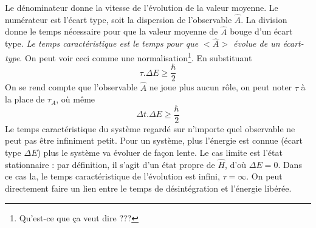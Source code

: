 Le dénominateur donne la vitesse de l'évolution de la valeur moyenne. Le numérateur est l'écart
type, soit la dispersion de l'observable $\hat A$. La division donne le temps nécessaire pour que la 
valeur moyenne de $\hat A$ bouge d'un écart type.\textit{ Le temps caractéristique est le temps pour que $<\hat A>$ évolue de un écart-type}. 
On peut voir ceci comme une normalisation\footnote{Qu'est-ce que ça veut dire ???}. En substituant
\begin{equation}
\tau.\Delta E \geq \dfrac{\hbar}{2}
\end{equation}
On se rend compte que l'observable $\hat A$ ne joue plus aucun rôle, on peut noter $\tau$ à 
la place de $\tau_A$, où même
\begin{equation}
\Delta t.\Delta E \geq\dfrac{\hbar}{2}
\end{equation}
Le temps caractéristique du système regardé sur n'importe quel observable ne peut pas être 
infiniment petit. Pour un système, plus l'énergie est connue (écart type $\Delta E$) plus le 
système va évoluer de façon lente. Le cas limite est l'état stationnaire : par définition, il 
s'agit d'un état propre de $\hat H$, d'où $\Delta E=0$. Dans ce cas la, le temps caractéristique 
de l'évolution est infini, $\tau=\infty$. On peut directement faire un lien entre le temps de 
désintégration et l'énergie libérée.
 
 
 
 
 
 
 
 
 
 
 
 
 
 
 